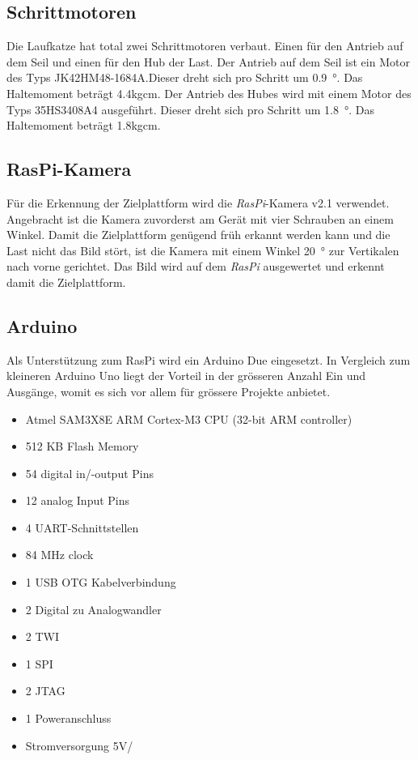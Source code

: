 \documentclass[a4paper]{report}
\begin{document}
\subsection{Schrittmotoren}
Die Laufkatze hat total zwei Schrittmotoren verbaut. Einen für den Antrieb auf dem Seil und einen für den Hub der Last. Der Antrieb auf dem Seil ist ein Motor des Typs JK42HM48-1684A.Dieser dreht sich pro Schritt um \SI{0.9}{\degree}. Das Haltemoment beträgt 4.4kgcm. Der Antrieb des Hubes wird mit einem Motor des Typs 35HS3408A4 ausgeführt. Dieser dreht sich pro Schritt um \SI{1.8}{\degree}. Das Haltemoment beträgt 1.8kgcm.


\subsection{RasPi-Kamera}
Für die Erkennung der Zielplattform wird die \textit{RasPi}-Kamera v2.1 verwendet. Angebracht ist die Kamera zuvorderst am Gerät mit vier Schrauben an einem Winkel. Damit die Zielplattform genügend früh erkannt werden kann und die Last nicht das Bild stört, ist die Kamera mit einem Winkel \SI{20}{\degree} zur Vertikalen nach vorne gerichtet. Das Bild wird auf dem \textit{RasPi} ausgewertet und erkennt damit die Zielplattform.

\subsection{Arduino}

Als Unterstützung zum RasPi wird ein Arduino Due eingesetzt. In Vergleich zum kleineren Arduino Uno liegt der Vorteil in der grösseren Anzahl Ein und Ausgänge, womit es sich vor allem für grössere Projekte anbietet.



\begin{itemize}[noitemsep]
	\item Atmel SAM3X8E ARM Cortex-M3 CPU (32-bit ARM controller)
	\item 512 KB Flash Memory
	\item 54 digital in/-output Pins
	\item 12 analog Input Pins
	\item 4 UART-Schnittstellen
	\item 84 MHz clock
	\item 1 USB OTG Kabelverbindung
	\item 2 Digital zu Analogwandler
	\item 2 TWI
	\item 1 SPI
	\item 2 JTAG
	\item 1 Poweranschluss
	\item Stromversorgung 5V/
\end{itemize}\parencite{ArduinoDue2018}
\end{document}
